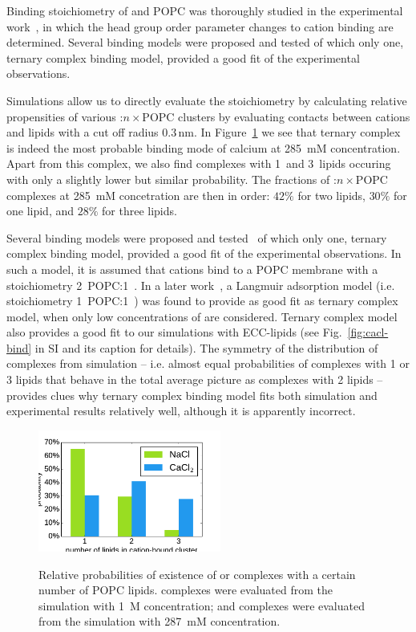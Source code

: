 \documentclass[aip,jcp,twocolumn]{revtex4}
\begin{document}
Binding stoichiometry of  and POPC was 
thoroughly studied in the experimental work~\cite{altenbach84},
in which the head group order parameter changes to cation binding are determined.
Several binding models were proposed and tested of which only one,
ternary complex binding model, provided a good fit of the experimental observations. 

Simulations allow us to directly evaluate the stoichiometry 
by calculating relative propensities of various :$n\times$POPC clusters
by evaluating contacts between cations and lipids with a cut off radius $0.3\,\mathrm{nm}$. 
In Figure~\ref{fig:cacl_complexes} we see that ternary complex is indeed 
the most probable binding mode of calcium at 285~mM concentration. 
Apart from this complex, we also find complexes with 1~and 3~lipids
occuring with only a slightly lower but similar probability.
The fractions of :$n\times$POPC complexes at 285~mM concetration 
are then in order:
$42\%$ for two lipids,
$30\%$ for one lipid, and
$28\%$ for three lipids.

Several binding models were proposed and tested~\cite{altenbach84} of which only one,
ternary complex binding model, provided a good fit of the experimental observations. 
In such a model, it is assumed that  cations bind to a POPC membrane 
with a stoichiometry 2~POPC:1~.
In a later work~\cite{macdonald87}, 
a Langmuir adsorption model (i.e. stoichiometry 1~POPC:1~) 
was found to provide as good fit as ternary complex model, 
when only low concentrations of  are considered.
Ternary complex model also provides a good fit 
to our simulations with ECC-lipids 
(see Fig.~\ref{fig:cacl-bind} in SI and its caption for details). 
The symmetry of the distribution of complexes from simulation --  
i.e. almost equal probabilities of complexes with 1 or 3 lipids 
that behave in the total average picture as complexes with 2 lipids -- 
provides clues why ternary complex binding model 
fits both simulation and experimental results relatively well, 
although it is apparently incorrect. 

\begin{figure}[tbp]
  \centering
  \includegraphics[width=6.0cm]{../Fig/ipython_nb/stoichiometry_NaCl-CaCl2_comparison_Ecc-lipids.pdf} \\
  \caption{\label{fig:cacl_complexes}
      Relative probabilities of existence of  or  complexes
      with a certain number of POPC lipids. 
       complexes were evaluated from the simulation with 1~M concentration;
      and  complexes were evaluated from the simulation with 287~mM concentration.
  }
\end{figure}
\end{document}
